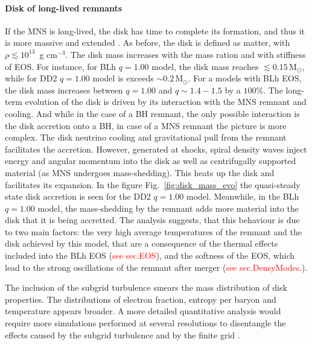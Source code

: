 \documentclass[11pt,a4paper,headinclude=true,DIV=14,BCOR=8mm,chapterprefix,listof=totoc,twoside,openright,abstracton]{scrbook}
\def\Msun{{\text{M}_{\odot}}}
\newcommand{\red}[1]{\textcolor{red}{#1}}
\newcommand{\gcm}{g cm$^{-3}$}
\begin{document}
\paragraph{Disk of long-lived remnants}


If the \ac{MNS} is long-lived, the disk has time to complete its formation,
and thus it is more massive and extended \citep{Perego:2019adq}. 
As before, the disk is defined as matter, with $\rho\lesssim10^{13}$~\gcm. 
The disk mass increases with the mass ration and with stiffness of \ac{EOS}.
For instance, for BLh $q=1.00$ model, the disk mass reaches ${\lesssim}0.15\,\Msun$, 
while for DD2 $q=1.00$ model is exceeds ${\sim}0.2\,\Msun$.
For a models with BLh \ac{EOS}, the disk mass increases between $q=1.00$ and 
$q\sim1.4-1.5$ by a $100\%$.
The long-term evolution of the disk is driven by its interaction with the \ac{MNS} 
remnant and cooling. 
And while in the case of a \ac{BH} remnant, the only possible interaction is the 
disk accretion onto a \ac{BH}, in case of a \ac{MNS} remnant the picture is more 
complex.
The disk neutrino cooling and gravitational pull from the remnant facilitates the 
accretion. However, generated at shocks, spiral density waves inject 
energy and angular momentum into the disk as well as centrifugally supported 
material (as \ac{MNS} undergoes mass-shedding). This heats up the disk and 
facilitates its expansion. 
In the figure  Fig.~\ref{fig:disk_mass_evo} the quasi-steady state disk accretion
is seen for the DD2 $q=1.00$ model. Meanwhile, in the BLh $q=1.00$ model, the 
mass-shedding by the remnant adds more material into the disk that it is being 
accretted. 
The analysis suggests, that this behaviour is due to two main factors: the 
very high average temperatures of the remnant and the disk achieved by this model, that 
are a consequence of the thermal effects included into the BLh EOS (\red{see sec.EOS}),
and the softness of the EOS, which lead to the strong oscillations of the 
remnant after merger (\red{see sec.DensyModes.}).

The inclusion of the subgrid turbulence smears the mass distribution of disk 
properties. The distributions of electron fraction, entropy per baryon and 
temperature appears broader. A more detailed quantitative analysis would require more 
simulations performed at several resolutions to disentangle the effects 
caused by the subgrid turbulence and by the finite grid \citep{Bernuzzi:2020txg,Radice:2020ids}.
\end{document}
